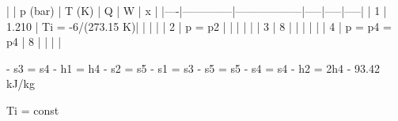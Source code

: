 |    | p (bar)      | T (K)            | Q   | W   | x   |
|----|--------------|------------------|-----|-----|-----|
| 1  | 1.210        | Ti = -6/(273.15 K)|     |     |     |
| 2  | p = p2       |                  |     |     |     |
| 3  | 8            |                  |     |     |     |
| 4  | p = p4 = p4  | 8                |     |     |     |

- s3 = s4
- h1 = h4
- s2 = s5
- s1 = s3
- s5 = s5
- s4 = s4
- h2 = 2h4
- 93.42 kJ/kg

Ti = const